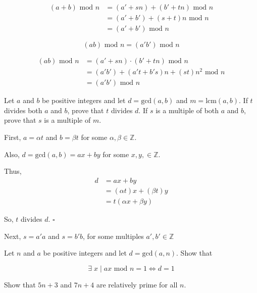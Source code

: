 \documentclass[11pt,largemargins]{homework}
\begin{document}
\begin{align*}
    (a+b)\text{ mod }n &= (a'+sn) + (b'+tn) \text{ mod }n\\
                     &= (a'+b') + (s+t)n\text{ mod }n\\
                     &= (a'+b')\text{ mod }n 
\end{align*}

\begin{equation}\tag{0.11b}
    (a b)\text{ mod }n = (a' b')\text{ mod }n 
\end{equation}

\begin{align*}
    (a b)\text{ mod }n &= (a'+sn) \cdot (b'+tn) \text{ mod }n\\
                       &= (a'b') + (a't + b's)n + (st)n^2\text{ mod }n\\
                       &= (a'b')\text{ mod }n 
\end{align*}

\question 
Let $a$ and $b$ be positive integers and let $d = \text{gcd}(a,b)$ and $m = \text{lcm}(a,b)$. If $t$ divides both $a$ and $b$, 
prove that $t$ divides $d$. If $s$ is a multiple of both $a$ and $b$, prove that $s$ is a multiple of $m$. 

\quad First, $a=\alpha t$ and $b=\beta t$ for some $\alpha, \beta \in\mathbb{Z}$.

\quad Also, $d=\text{gcd}(a,b)=ax+by$ for some $x, y, \in\mathbb{Z}$.

\quad Thus,
\begin{align*}
    d &= ax+by\\
      &= (\alpha t)x+(\beta t)y\\
      &= t(\alpha x + \beta y)
\end{align*}

\quad So, $t$ divides $d$. $\square$

\hfill

\quad Next, $s = a'a$ and $s = b'b$, for some multiples $a', b' \in\mathbb{Z}$


\question 
Let $n$ and $a$ be positive integers and let $d=\text{gcd}(a,n)$. Show that  

\begin{equation}\tag{0.13}
    \exists \; x \; | \; ax\text{ mod }n=1 \iff d=1
\end{equation}

\question 
Show that $5n+3$ and $7n+4$ are relatively prime for all $n$.
\end{document}
